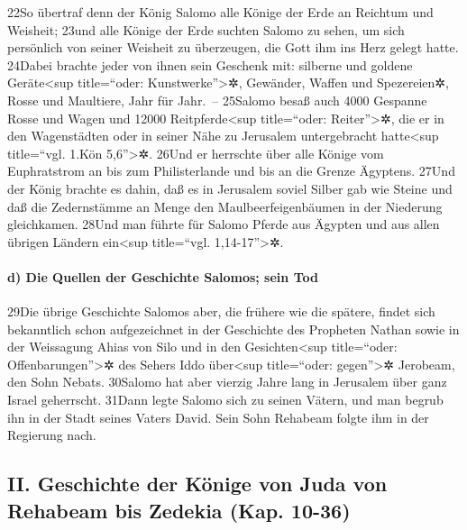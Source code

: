 22So übertraf denn der König Salomo alle Könige der Erde an Reichtum und
Weisheit; 23und alle Könige der Erde suchten Salomo zu sehen, um sich
persönlich von seiner Weisheit zu überzeugen, die Gott ihm ins Herz
gelegt hatte. 24Dabei brachte jeder von ihnen sein Geschenk mit:
silberne und goldene Geräte\textless sup title=``oder:
Kunstwerke''\textgreater✲, Gewänder, Waffen und Spezereien✲, Rosse und
Maultiere, Jahr für Jahr.~-- 25Salomo besaß auch 4000 Gespanne Rosse und
Wagen und 12000 Reitpferde\textless sup title=``oder:
Reiter''\textgreater✲, die er in den Wagenstädten oder in seiner Nähe zu
Jerusalem untergebracht hatte\textless sup title=``vgl. 1.Kön
5,6''\textgreater✲. 26Und er herrschte über alle Könige vom Euphratstrom
an bis zum Philisterlande und bis an die Grenze Ägyptens. 27Und der
König brachte es dahin, daß es in Jerusalem soviel Silber gab wie Steine
und daß die Zedernstämme an Menge den Maulbeerfeigenbäumen in der
Niederung gleichkamen. 28Und man führte für Salomo Pferde aus Ägypten
und aus allen übrigen Ländern ein\textless sup title=``vgl.
1,14-17''\textgreater✲.

\hypertarget{d-die-quellen-der-geschichte-salomos-sein-tod}{%
\paragraph{d) Die Quellen der Geschichte Salomos; sein
Tod}\label{d-die-quellen-der-geschichte-salomos-sein-tod}}

29Die übrige Geschichte Salomos aber, die frühere wie die spätere,
findet sich bekanntlich schon aufgezeichnet in der Geschichte des
Propheten Nathan sowie in der Weissagung Ahias von Silo und in den
Gesichten\textless sup title=``oder: Offenbarungen''\textgreater✲ des
Sehers Iddo über\textless sup title=``oder: gegen''\textgreater✲
Jerobeam, den Sohn Nebats. 30Salomo hat aber vierzig Jahre lang in
Jerusalem über ganz Israel geherrscht. 31Dann legte Salomo sich zu
seinen Vätern, und man begrub ihn in der Stadt seines Vaters David. Sein
Sohn Rehabeam folgte ihm in der Regierung nach.

\hypertarget{ii.-geschichte-der-kuxf6nige-von-juda-von-rehabeam-bis-zedekia-kap.-10-36}{%
\subsection{II. Geschichte der Könige von Juda von Rehabeam bis Zedekia
(Kap.
10-36)}\label{ii.-geschichte-der-kuxf6nige-von-juda-von-rehabeam-bis-zedekia-kap.-10-36}}

